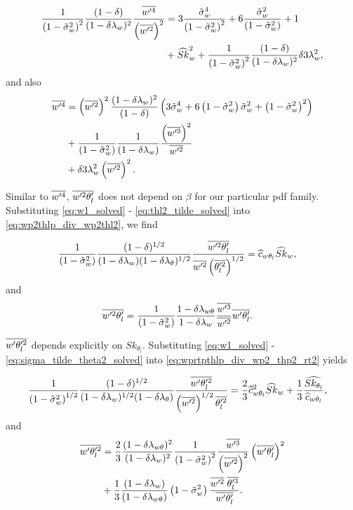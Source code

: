 \begin{align}
    \label{eq:wp4_div_wp2_2_solved}
    \frac{1}{\left( 1 - \tilde{\sigma}_w^2 \right)^2} \frac{(1-\delta)}{(1-\delta \lambda_w)^2} \frac{\overline{w'^4}}{\left(\overline{w'^2}\right)^2}
    &= 3 \frac{{\tilde{\sigma}_w}^4}{\left( 1 - \tilde{\sigma}_w^2 \right)^2} + 6 \frac{{\tilde{\sigma}_w}^2}{\left( 1 - \tilde{\sigma}_w^2 \right)} + 1 \nonumber\\
    &+ \widehat{Sk}_w^2 + \frac{1}{\left( 1 - \tilde{\sigma}_w^2 \right)^2} \frac{(1-\delta)}{(1-\delta \lambda_w)^2} \delta 3 \lambda_w^2,
\end{align}
and also
\begin{align}
    \label{eq:wp4}
    \overline{w'^4}
    &= \left(\overline{w'^2}\right)^2 \frac{(1-\delta \lambda_w)^2}{(1-\delta)}\left(3 \tilde{\sigma}_w^4 + 6 \left( 1 - \tilde{\sigma}_w^2 \right) \tilde{\sigma}_w^2 + \left( 1 - \tilde{\sigma}_w^2 \right)^2\right) \nonumber\\
    &+ \frac{1}{\left( 1 - \tilde{\sigma}_w^2 \right)} \frac{1}{(1-\delta \lambda_w)} \frac{\left(\overline{w'^3}\right)^2}{\overline{w'^2}} \nonumber\\
    &+ \delta 3 \lambda_w^2 \left(\overline{w'^2}\right)^2.
\end{align}

Similar to $\overline{w'^4}$, $\overline{w'^2 \theta_l'}$ does not depend on $\beta$ for our particular \gls{pdf} family.
Substituting \cref{eq:w1_solved} - \cref{eq:thl2_tilde_solved} into \cref{eq:wp2thlp_div_wp2thl2}, we find

\begin{align}
    \label{eq:wp2thlp_sk_w_solved}
    \frac{1}{\left( 1 - \tilde{\sigma}_w^2 \right)} \frac{(1-\delta)^{1/2}}{(1-\delta \lambda_w) (1-\delta \lambda_\theta)^{1/2}} \frac{\overline{w'^2\theta_l'}}{\overline{w'^2} \left(\overline{\theta_l'^2} \right)^{1/2}}
    &= \widehat{c}_{w\theta_l} \widehat{Sk}_w,
\end{align}
and
\begin{align}
    \label{eq:wp2thlp_solved}
    \overline{w'^2\theta_l'}
    &= \frac{1}{\left( 1 - \tilde{\sigma}_w^2 \right)} \frac{1 - \delta \lambda_{w\theta}}{1-\delta \lambda_w} \frac{\overline{w'^3}}{\overline{w'^2}} \overline{w'\theta_l'}.
\end{align}

$\overline{w' \theta_l'^2}$ depends explicitly on $Sk_{\theta_l}$.
Substituting \cref{eq:w1_solved} - \cref{eq:sigma_tilde_theta2_solved} into \cref{eq:wprtpthlp_div_wp2_thp2_rt2} yields

\begin{align}
    \label{eq:wpthlp2_sk_w_solved}
    \frac{1}{\left( 1 - \tilde{\sigma}_w^2 \right)^{1/2}} \frac{(1-\delta)^{1/2}}{(1-\delta \lambda_w)^{1/2} (1-\delta \lambda_\theta)} \frac{\overline{w'\theta_l'^2}}{\left(\overline{w'^2}\right)^{1/2} \overline{\theta_l'^2}}
    &= \frac{2}{3} \widehat{c}_{w\theta_l}^2 \widehat{Sk}_w + \frac{1}{3} \frac{ \widehat{Sk_{\theta_l}} } {\widehat{c}_{w\theta_l}},
\end{align}
and
\begin{align}
    \label{eq:wpthlp2_solved}
    \overline{w'\theta_l'^2}
    &= \frac{2}{3} \frac{(1-\delta \lambda_{w \theta})^2}{(1-\delta \lambda_w)^2} \frac{1}{\left( 1 - \tilde{\sigma}_w^2 \right)^2} \frac{\overline{w'^3}}{\left(\overline{w'^2} \right)^2} \left(\overline{w'\theta_l'} \right)^2 \nonumber\\
    &+ \frac{1}{3} \frac{(1-\delta \lambda_w)}{(1-\delta \lambda_{w \theta})} \left( 1 - \tilde{\sigma}_w^2 \right) \frac{\overline{w'^2} \; \overline{\theta_l'^3} }{\overline{w'\theta_l'}}.
\end{align}

